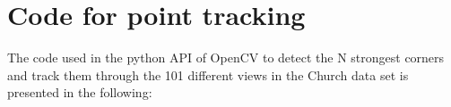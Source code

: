 \chapter{Code for point tracking}
\label{sec:Appendix_A}

The code used in the python API of OpenCV to detect the N strongest corners and track them through the 101 different views in the Church data set is presented in the following:



